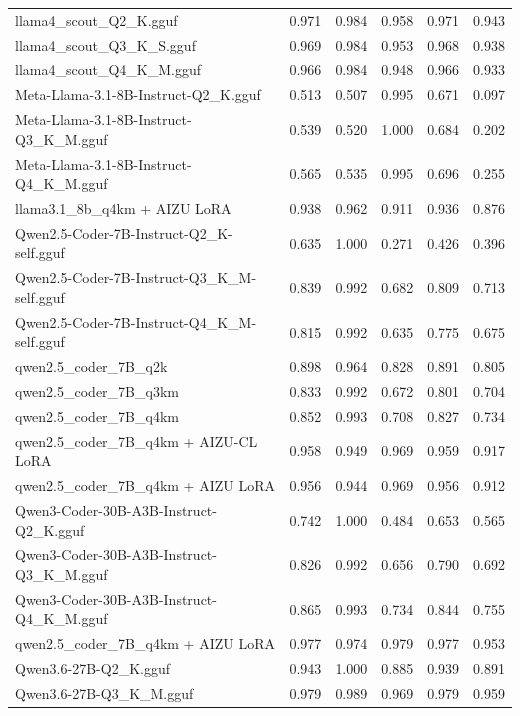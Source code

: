 \begin{table}[htbp]
{\begin{tabular}{lrrrrr}
    llama4\_scout\_Q2\_K.gguf & 0.971 & 0.984 & 0.958 & 0.971 & \cellcolor{green!10}0.943 \\
    llama4\_scout\_Q3\_K\_S.gguf & 0.969 & 0.984 & 0.953 & 0.968 & 0.938 \\
    llama4\_scout\_Q4\_K\_M.gguf & 0.966 & 0.984 & 0.948 & 0.966 & 0.933 \\
    Meta-Llama-3.1-8B-Instruct-Q2\_K.gguf & 0.513 & 0.507 & 0.995 & 0.671 & 0.097 \\
    Meta-Llama-3.1-8B-Instruct-Q3\_K\_M.gguf & 0.539 & 0.520 & 1.000 & 0.684 & 0.202 \\
    Meta-Llama-3.1-8B-Instruct-Q4\_K\_M.gguf & 0.565 & 0.535 & 0.995 & 0.696 & 0.255 \\
    llama3.1\_8b\_q4km + AIZU LoRA & 0.938 & 0.962 & 0.911 & 0.936 & 0.876 \\
    Qwen2.5-Coder-7B-Instruct-Q2\_K-self.gguf & 0.635 & 1.000 & 0.271 & 0.426 & 0.396 \\
    Qwen2.5-Coder-7B-Instruct-Q3\_K\_M-self.gguf & 0.839 & 0.992 & 0.682 & 0.809 & 0.713 \\
    Qwen2.5-Coder-7B-Instruct-Q4\_K\_M-self.gguf & 0.815 & 0.992 & 0.635 & 0.775 & 0.675 \\
    qwen2.5\_coder\_7B\_q2k & 0.898 & 0.964 & 0.828 & 0.891 & 0.805 \\
    qwen2.5\_coder\_7B\_q3km & 0.833 & 0.992 & 0.672 & 0.801 & 0.704 \\
    qwen2.5\_coder\_7B\_q4km & 0.852 & 0.993 & 0.708 & 0.827 & 0.734 \\
    qwen2.5\_coder\_7B\_q4km + AIZU-CL LoRA & 0.958 & 0.949 & 0.969 & 0.959 & 0.917 \\
    qwen2.5\_coder\_7B\_q4km + AIZU LoRA & 0.956 & 0.944 & 0.969 & 0.956 & 0.912 \\
    Qwen3-Coder-30B-A3B-Instruct-Q2\_K.gguf & 0.742 & 1.000 & 0.484 & 0.653 & 0.565 \\
    Qwen3-Coder-30B-A3B-Instruct-Q3\_K\_M.gguf & 0.826 & 0.992 & 0.656 & 0.790 & 0.692 \\
    Qwen3-Coder-30B-A3B-Instruct-Q4\_K\_M.gguf & 0.865 & 0.993 & 0.734 & 0.844 & 0.755 \\
    qwen2.5\_coder\_7B\_q4km + AIZU LoRA & 0.977 & 0.974 & 0.979 & 0.977 & \cellcolor{green!20}0.953 \\
    Qwen3.6-27B-Q2\_K.gguf & 0.943 & 1.000 & 0.885 & 0.939 & 0.891 \\
    Qwen3.6-27B-Q3\_K\_M.gguf & 0.979 & 0.989 & 0.969 & 0.979 & \cellcolor{green!40}0.959 \\

\end{tabular}}
\end{table}

